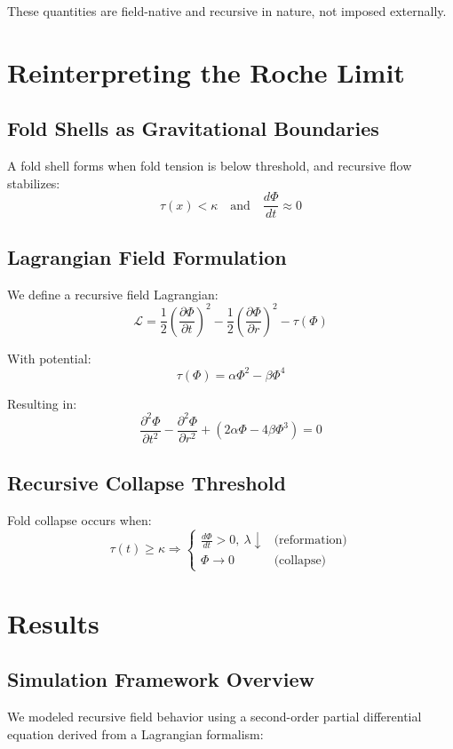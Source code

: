 \documentclass[12pt]{article}
\begin{document}
These quantities are field-native and recursive in nature, not imposed externally.

\section{Reinterpreting the Roche Limit}

\subsection{Fold Shells as Gravitational Boundaries}
A fold shell forms when fold tension is below threshold, and recursive flow stabilizes:
\[
\tau(x) < \kappa \quad \text{and} \quad \frac{d\Phi}{dt} \approx 0
\]

\subsection{Lagrangian Field Formulation}
We define a recursive field Lagrangian:
\[
\mathcal{L} = \frac{1}{2} \left( \frac{\partial \Phi}{\partial t} \right)^2 - \frac{1}{2} \left( \frac{\partial \Phi}{\partial r} \right)^2 - \tau(\Phi)
\]

With potential:
\[
\tau(\Phi) = \alpha \Phi^2 - \beta \Phi^4
\]

Resulting in:
\[
\frac{\partial^2 \Phi}{\partial t^2} - \frac{\partial^2 \Phi}{\partial r^2} + (2\alpha \Phi - 4\beta \Phi^3) = 0
\]

\subsection{Recursive Collapse Threshold}
Fold collapse occurs when:
\begin{equation}
\tau(t) \geq \kappa \Rightarrow
\begin{cases}
\frac{d\Phi}{dt} > 0,\ \lambda \downarrow & \text{(reformation)} \\
\Phi \rightarrow 0 & \text{(collapse)}
\end{cases}
\end{equation}


\section{Results}
\subsection{Simulation Framework Overview}

We modeled recursive field behavior using a second-order partial differential equation derived from a Lagrangian formalism:
\end{document}
